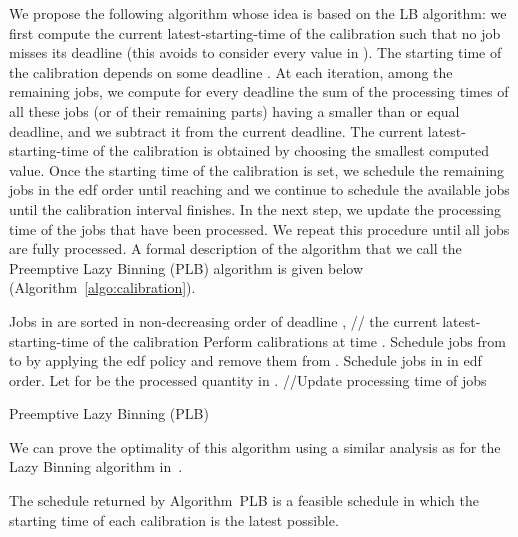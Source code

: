We propose the following algorithm whose idea is based on the LB algorithm:  we first compute the current latest-starting-time
of the calibration
such that no job misses its deadline (this avoids to consider every value in ).
The starting time of the calibration depends on some deadline . At each iteration, among the remaining jobs, we compute for every deadline the sum of the processing times of all these jobs (or of their remaining parts) having a smaller than or equal deadline, and we subtract it from the current deadline. The current latest-starting-time of the calibration is obtained by choosing the smallest computed value.
Once the starting time of the calibration is
set, we schedule the remaining jobs in the {\sc edf} order until reaching
 and we continue to schedule the available jobs until the
calibration interval finishes.
In the next step, we update the processing time of the jobs that have been
processed. We repeat this procedure until all jobs are fully processed. A formal description of the algorithm that we call the Preemptive Lazy Binning (PLB) algorithm is given below (Algorithm~\ref{algo:calibration}).

\begin{algorithm}[thbp]
\begin{algorithmic}[1] 
\STATE Jobs in  are sorted in non-decreasing order of deadline
\WHILE{}
	\STATE ,  // the current latest-starting-time of the calibration
	\FOR{}
		\IF{}
			\STATE 
			\STATE 
		\ENDIF
	\ENDFOR
\STATE 
	\STATE Perform calibrations at time .
	\STATE Schedule jobs  from  to  by applying the {\sc edf} policy and remove them from .
	\STATE Schedule jobs  in  in {\sc edf} order.
	\STATE Let  for  be the processed quantity in .
	\STATE //Update processing time of jobs
	\FOR{}
		\STATE 
		\IF{}
			\STATE 
		\ENDIF
	\ENDFOR
\ENDWHILE
\end{algorithmic}
\caption{Preemptive Lazy Binning (PLB)}
\label{algo:calibration}
\end{algorithm}

We can prove the optimality of this algorithm using a similar analysis as for the Lazy Binning algorithm in~\cite{bender2013efficient}.


\begin{prop}\label{prop:algo_latest_starting_time}
The schedule returned by Algorithm~PLB is a feasible schedule in
which the starting time of each calibration is the latest possible.
\end{prop}


